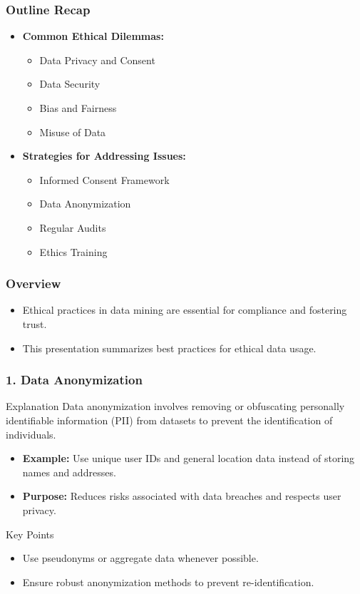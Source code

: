 \documentclass[aspectratio=169]{beamer}
\begin{document}
\begin{frame}[fragile]
    \frametitle{Outline Recap}
    \begin{itemize}
        \item \textbf{Common Ethical Dilemmas:}
            \begin{itemize}
                \item Data Privacy and Consent
                \item Data Security
                \item Bias and Fairness
                \item Misuse of Data
            \end{itemize}
        \item \textbf{Strategies for Addressing Issues:}
            \begin{itemize}
                \item Informed Consent Framework
                \item Data Anonymization
                \item Regular Audits
                \item Ethics Training
            \end{itemize}
    \end{itemize}
\end{frame}

\begin{frame}[fragile]
    \frametitle{Overview}
    \begin{itemize}
        \item Ethical practices in data mining are essential for compliance and fostering trust.
        \item This presentation summarizes best practices for ethical data usage.
    \end{itemize}
\end{frame}

\begin{frame}[fragile]
    \frametitle{1. Data Anonymization}
    \begin{block}{Explanation}
        Data anonymization involves removing or obfuscating personally identifiable information (PII) from datasets to prevent the identification of individuals.
    \end{block}
    \begin{itemize}
        \item \textbf{Example:} Use unique user IDs and general location data instead of storing names and addresses.
        \item \textbf{Purpose:} Reduces risks associated with data breaches and respects user privacy.
    \end{itemize}
    \begin{block}{Key Points}
        \begin{itemize}
            \item Use pseudonyms or aggregate data whenever possible.
            \item Ensure robust anonymization methods to prevent re-identification.
        \end{itemize}
    \end{block}
\end{frame}
\end{document}
